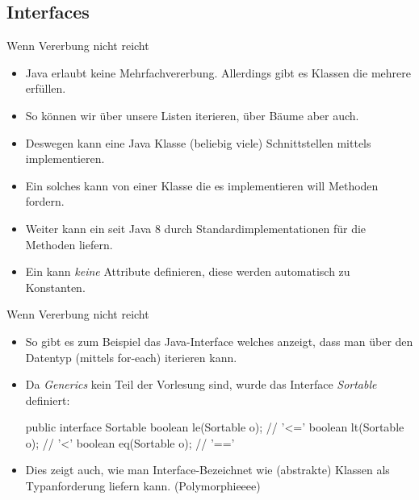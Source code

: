 \subsection{Interfaces}


\begin{frame}{Wenn Vererbung nicht reicht}
    \begin{itemize}[<+(1)->]
        \item Java erlaubt keine Mehrfachvererbung.\pause{} Allerdings gibt es Klassen die mehrere  erfüllen.
        \item So können wir über unsere Listen iterieren,\pause{} über Bäume aber auch.
        \item Deswegen kann eine Java Klasse (beliebig viele) Schnittstellen mittels  implementieren.
        \item Ein solches  kann von einer Klasse die es implementieren will Methoden fordern.
        \item Weiter kann ein  seit Java \(8\) durch  Standardimplementationen für die Methoden liefern.
        \item Ein  kann \emph{keine} Attribute definieren, diese werden automatisch zu Konstanten.
    \end{itemize}
\end{frame}

\begin{frame}[fragile]{Wenn Vererbung nicht reicht}
    \begin{itemize}[<+(1)->]
        \item So gibt es zum Beispiel das Java-Interface  welches anzeigt, dass man über den Datentyp (mittels for-each) iterieren kann.
        \item Da \emph{Generics} kein Teil der Vorlesung sind, wurde das Interface \emph{Sortable} definiert:\pause{}
\begin{plainjava}
public interface Sortable {
    boolean le(Sortable o); // '<='
    boolean lt(Sortable o); // '<'
    boolean eq(Sortable o); // '=='
}
\end{plainjava}
        \item Dies zeigt auch, wie man Interface-Bezeichnet wie (abstrakte) Klassen als Typanforderung liefern kann.\pause{} (Polymorphieeee)
    \end{itemize}
\end{frame}

